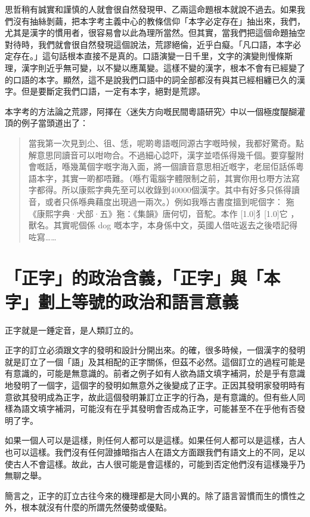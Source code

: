 \documentclass[a5paper, 12pt, openany]{book} %
\begin{document}
思哲稍有誠實和謹慎的人就會很自然發現甲、乙兩這命題根本就說不過去。如果我們沒有抽絲剝繭，把本字考主義中心的教條信仰「本字必定存在」抽出來，我們，尤其是漢字的慣用者，很容易會以此為理所當然。但其實，當我們把這個命題抽空對待時，我們就會很自然發現這個說法，荒謬絕倫，近乎白癡。「凡口語，本字必定存在。」這句話根本直接不是真的。口語演變一日千里，文字的演變則慢條斯理，漢字則近乎無可變，以不變以應萬變。這樣不變的漢字，根本不會有已經變了的口語的本字。顯然，這不是說我們口語中的詞全部都沒有與其已經相纏已久的漢字。但是要斷定我們口語，一定有本字，絕對是荒謬。

本字考的方法論之荒謬，阿擇在〈迷失方向嘅民間粵語研究〉中以一個極度醍醐灌頂的例子當頭道出了： 

\begin{quotation}
當我第一次見到尐、徂、恁，呢啲粵語嘅同源古字嘅時候，我都好驚奇。點解意思同讀音可以咁吻合。不過細心諗吓，漢字並唔係得幾千個。要穿鑿附會嘅話，喺幾萬個字嘅字海入面，將一個讀音意思相近嘅字，老屈佢話係粵語本字，其實一啲都唔難。（喺冇電腦字體限制之前，其實你用乜嘢方法寫字都得。所以康熙字典先至可以收錄到40000個漢字。其中有好多只係得讀音，或者只係喺典藉度出現過一兩次。）例如我喺古書度搵到呢個字： 狏《康熙字典·犬部·五》狏：《集韻》唐何切，音駝。本作 \scalebox{0.5}[1.0]{犭}\scalebox{0.5}[1.0]{它} ，獸名。其實呢個係 dog 嘅本字，本身係中文，英國人借咗返去之後唔記得咗寫…… 

\end{quotation}

\section{「正字」的政治含義，「正字」與「本字」劃上等號的政治和語言意義}

正字就是一錘定音，是人類訂立的。 

正字的訂立必須跟文字的發明和設計分開出來。的確，很多時候，一個漢字的發明就是訂立了一個「語」及其相配的正字關係，但茲不必然。這個訂立的過程可能是有意識的，可能是無意識的。前者之例子如有人欲為語文填字補洞，於是乎有意識地發明了一個字，這個字的發明如無意外之後變成了正字。正因其發明家發明時有意欲其發明成為正字，故此這個發明兼訂立正字的行為，是有意識的。但有些人同樣為語文填字補洞，可能沒有在乎其發明會否成為正字，可能甚至不在乎他有否發明了字。

如果一個人可以是這樣，則任何人都可以是這樣。如果任何人都可以是這樣，古人也可以這樣。我們沒有任何證據暗指古人在語文方面跟我們有語文上的不同，足以使古人不會這樣。故此，古人很可能是會這樣的，可能到否定他們沒有這樣幾乎乃無聊之舉。

簡言之，正字的訂立古往今來的機理都是大同小異的。除了語言習慣而生的慣性之外，根本就沒有什麼的所謂先然優勢或優點。
\end{document}
